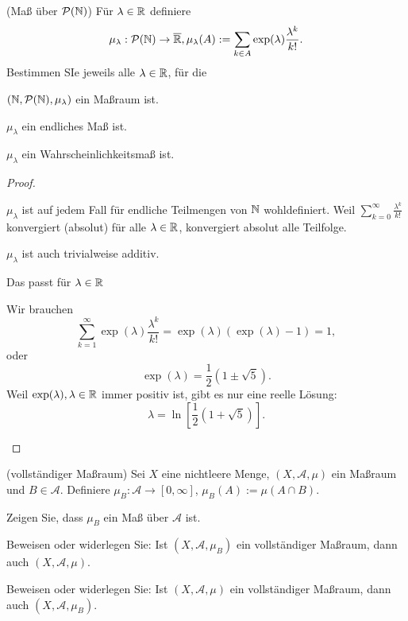 \begin{Problem}
	(Maß über $\mathcal{P}(\mathbb{N})$) Für $\lambda \in \mathbb{R}$ definiere
	\[
	\mu_\lambda:\mathcal{P}(\mathbb{N})\to \overline{\mathbb{R}}, \mu_\lambda(A):=\sum_{k\in A} \exp(\lambda) \frac{\lambda^k}{k!}
	.\] 
	Bestimmen SIe jeweils alle $\lambda\in \mathbb{R}$, f\"{u}r die
	\begin{parts}
		\item $(\mathbb{N}, \mathcal{P}(\mathbb{N}), \mu_\lambda)$ ein Maßraum ist.
		\item $\mu_\lambda$ ein endliches Maß ist.
		\item $\mu_\lambda$ ein Wahrscheinlichkeitsmaß ist.
	\end{parts}
\end{Problem}
\begin{proof}
	\begin{parts}
	\item $\mu_\lambda$ ist auf jedem Fall f\"{u}r endliche Teilmengen von $\mathbb{N}$ wohldefiniert. Weil $\sum_{k=0}^\infty \frac{\lambda^k}{k!}$ konvergiert (absolut) f\"{u}r alle $\lambda\in\mathbb{R}$, konvergiert absolut alle Teilfolge. 

		$\mu_\lambda$ ist auch trivialweise additiv.
	\item Das passt f\"{u}r $\lambda \in \mathbb{R}$ 
	\item Wir brauchen 
		\[
		\sum_{k=1}^{\infty} \exp(\lambda) \frac{\lambda^k}{k!}=\exp(\lambda)(\exp(\lambda)-1)=1
		,\] 
		oder 
		\[
		\exp(\lambda)=\frac{1}{2}(1\pm \sqrt{5} )
		.\]
		Weil $\exp(\lambda), \lambda \in \mathbb{R}$ immer positiv ist, gibt es nur eine reelle Lösung:
		\[
		\lambda=\ln\left[ \frac{1}{2}\left( 1+\sqrt{5}  \right)  \right] 
		.\] 
	\end{parts}
\end{proof}
\begin{Problem}
	(vollständiger Maßraum) Sei $X$ eine nichtleere Menge, $(X, \mathcal{A}, \mu)$ ein Maßraum und $B \in \mathcal{A}$. Definiere $\mu_B : \mathcal{A} \to [0, \infty]$, $\mu_B (A) := \mu(A \cap B)$.
	\begin{parts}
	\item Zeigen Sie, dass $\mu_B$ ein Maß über $\mathcal{A}$ ist.
	\item  Beweisen oder widerlegen Sie: Ist $(X, \mathcal{A}, \mu_B)$ ein vollständiger Maßraum, dann auch $(X, \mathcal{A}, \mu)$.
	\item  Beweisen oder widerlegen Sie: Ist $(X, \mathcal{A}, \mu)$ ein vollständiger Maßraum, dann auch $(X, \mathcal{A}, \mu_B)$.
	\end{parts}
\end{Problem}
